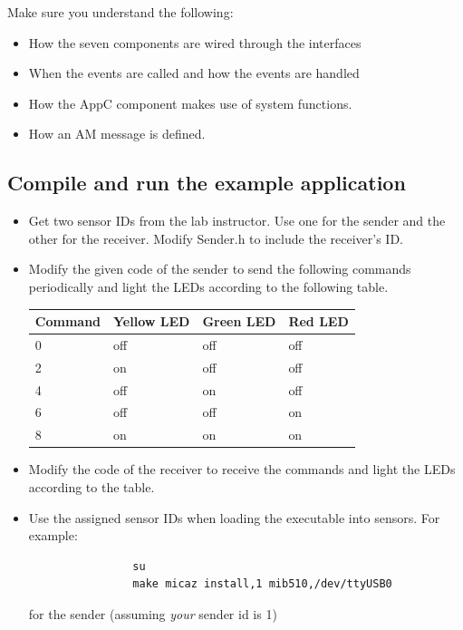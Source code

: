 \documentclass[letterpaper,12pt]{article}
\begin{document}
    Make sure you understand the following:
    \begin{itemize}
        \item How the seven components are wired through the interfaces
        \item When the events are called and how the events are handled
        \item How the AppC component makes use of system functions.
        \item How an AM message is defined.
    \end{itemize}

\subsection*{Compile and run the example application}
    \begin{itemize}
        \item Get two sensor IDs from the lab instructor. Use one for the sender and the other for the receiver. Modify Sender.h to include the receiver's ID.
        \item Modify the given code of the sender to send the following commands periodically and light the LEDs according to the following table.
        \begin{table}[H]
        \begin{center}
            \begin{tabular}{ |l|l|l|l| }
                \hline
                \textbf{Command} & \textbf{Yellow LED} & \textbf{Green LED} & \textbf{Red LED} \\ \hline
                0 & off & off & off \\ \hline
                2 & on & off & off \\ \hline
                4 & off & on & off \\ \hline
                6 & off & off & on \\ \hline
                8 & on & on & on \\ \hline
            \end{tabular}
        \end{center}
        \end{table}
        \item Modify the code of the receiver to receive the commands and light the LEDs according to the table.
        \item Use the assigned sensor IDs when loading the executable into sensors. For example:
            \begin{lstlisting}
                su
                make micaz install,1 mib510,/dev/ttyUSB0
            \end{lstlisting}
            for the sender (assuming \emph{your} sender id is 1)
    \end{itemize}
\end{document}
